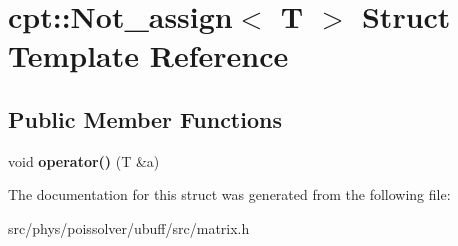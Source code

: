 \hypertarget{structcpt_1_1Not__assign}{}\section{cpt\+:\+:Not\+\_\+assign$<$ T $>$ Struct Template Reference}
\label{structcpt_1_1Not__assign}
\subsection*{Public Member Functions}
\begin{DoxyCompactItemize}
\item 
void {\bfseries operator()} (T \&a)\hypertarget{structcpt_1_1Not__assign_a2fd13b93283f3f1345f6cf8c4ecb701b}{}\label{structcpt_1_1Not__assign_a2fd13b93283f3f1345f6cf8c4ecb701b}

\end{DoxyCompactItemize}


The documentation for this struct was generated from the following file\+:\begin{DoxyCompactItemize}
\item 
src/phys/poissolver/ubuff/src/matrix.\+h\end{DoxyCompactItemize}
